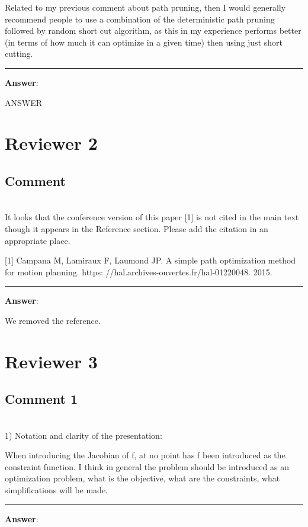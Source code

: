 \documentclass{scrartcl}
\begin{document}
Related to my previous comment about path pruning, then I would generally recommend people to use a combination of the deterministic path pruning followed by random short cut algorithm, as this in my experience performs better (in terms of how much it can optimize in a given time) then using just short cutting.


\rule{\linewidth}{.1pt}
\textbf{Answer}:

ANSWER


\section{Reviewer 2}

\subsection{Comment}
\hrulefill\\


It looks that the conference version of this paper [1] is not cited in the main text though it appears in the Reference section.  Please add the citation in an appropriate place.

[1] Campana M, Lamiraux F, Laumond JP. A simple path optimization method for motion planning. https:
//hal.archives-ouvertes.fr/hal-01220048. 2015.

\rule{\linewidth}{.1pt}
\textbf{Answer}:

We removed the reference.


\section{Reviewer 3}

\subsection{Comment 1}
\hrulefill\\

1) Notation and clarity of the presentation:

When introducing the Jacobian of f, at no point has f been introduced as the constraint function. I think in general the problem should be introduced as an optimization problem, what is the objective, what are the constraints, what simplifications will be made.

\rule{\linewidth}{.1pt}
\textbf{Answer}:
\end{document}
